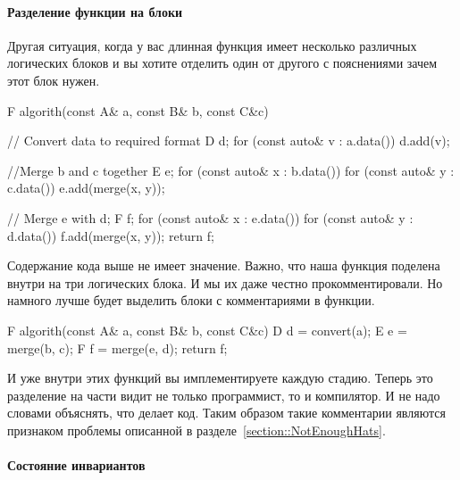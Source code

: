 \paragraph{Разделение функции на блоки}

Другая ситуация, когда у вас длинная функция имеет несколько различных логических блоков и вы хотите отделить один от другого с пояснениями зачем этот блок нужен.
\begin{cppcode}
F algorith(const A& a, const B& b, const C&c) {
  // Convert data to required format
  D d;
  for (const auto& v : a.data()) {
    d.add(v);
  }
  
  //Merge b and c together
  E e;
  for (const auto& x : b.data()) {
    for (const auto& y : c.data()) {
      e.add(merge(x, y));
    }
  }
  
  // Merge e with d;
  F f;
  for (const auto& x : e.data()) {
    for (const auto& y : d.data()) {
      f.add(merge(x, y));
    }
  }
  return f;
}
\end{cppcode}
Содержание кода выше не имеет значение.
Важно, что наша функция поделена внутри на три логических блока.
И мы их даже честно прокомментировали.
Но намного лучше будет выделить блоки с комментариями в функции.
\begin{cppcode}
F algorith(const A& a, const B& b, const C&c) {
  D d = convert(a);
  E e = merge(b, c);
  F f = merge(e, d);
  return f;
}
\end{cppcode}
И уже внутри этих функций вы имплементируете каждую стадию.
Теперь это разделение на части видит не только программист, то и компилятор.
И не надо словами объяснять, что делает код.
Таким образом такие комментарии являются признаком проблемы описанной в разделе~\ref{section::NotEnoughHats}.

\paragraph{Состояние инвариантов}

